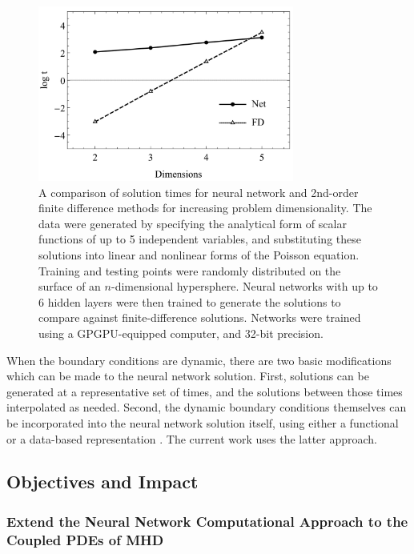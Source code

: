 \documentclass{article}
\begin{document}
\begin{figure}
  \centering
  \includegraphics[width=0.75\textwidth]{Avrutskiy_2017.png}
  \caption{A comparison of solution times for neural network and 2nd-order finite difference methods for increasing problem dimensionality. The data were generated by specifying the analytical form of scalar functions of up to 5 independent variables, and substituting these solutions into linear and nonlinear forms of the Poisson equation. Training and testing points were randomly distributed on the surface of an $n$-dimensional hypersphere. Neural networks with up to 6 hidden layers were then trained to generate the solutions to compare against finite-difference solutions. Networks were trained using a GPGPU-equipped computer, and 32-bit precision. \cite{Avrutskiy2017}}
  \label{fig:Avrutskiy_2017}
\end{figure}

When the boundary conditions are dynamic, there are two basic modifications which can be made to the neural network solution. First, solutions can be generated at a representative set of times, and the solutions between those times interpolated as needed. Second, the dynamic boundary conditions themselves can be incorporated into the neural network solution itself, using either a functional or a data-based representation \cite{Lagaris1998}. The current work uses the latter approach.

\subsection{Objectives and Impact}

\subsubsection{Extend the Neural Network Computational Approach to the Coupled PDEs of MHD}
\end{document}
